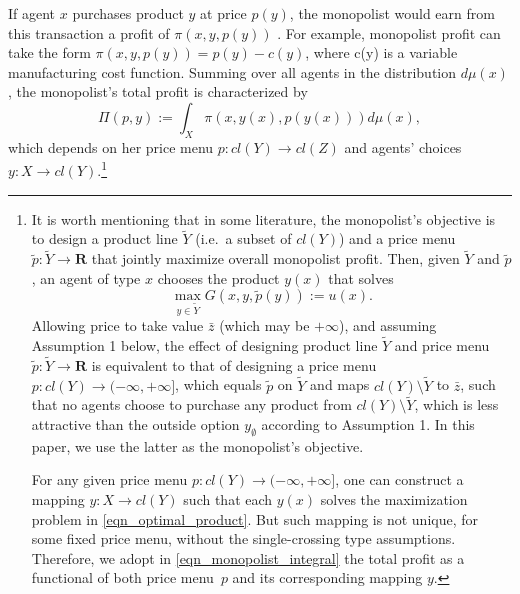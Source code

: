 \documentclass[a4paper, 11pt]{amsart}
\numberwithin{equation}{section}
\theoremstyle{plain}
\theoremstyle{definition}
\theoremstyle{remark}
\newcommand{\R}{\mathbf{R}}
\begin{document}
If agent $x$ purchases product $y$ at price $p(y)$, the monopolist would earn from this transaction a profit of $\pi(x,y,p(y))$%
.  {For example, monopolist profit can take the form $\pi(x,y,p(y)) = p(y)-c(y)$, where %
c(y) is a variable manufacturing cost function.} Summing over all agents in the distribution $d\mu(x)$, the monopolist's total profit is characterized by 
\begin{equation}\label{eqn_monopolist_integral}
	\Pi(p, y):=\int_{X} \pi(x, y(x), p(y(x))) d\mu(x),
\end{equation}
which depends on her price menu $p: cl(Y) \rightarrow cl(Z)$ and  agents' choices $y: X \rightarrow cl(Y)$.\footnote{It is worth mentioning that in some literature, the monopolist's objective is to design a product line $\tilde{Y}$ (i.e.~a subset of $cl(Y)$) and a price menu $\tilde{p}: \tilde{Y} \rightarrow \R$ that jointly maximize overall monopolist profit. Then, given $\tilde{Y}$ and $\tilde{p}$, an agent of type $x$ chooses the product $y(x)$ that solves
	\begin{equation*}
		\max_{y \in \tilde{Y}} G(x,y, \tilde{p}(y)):= u(x).
	\end{equation*}
Allowing price to take value $\bar{z}$ (which may be $+\infty$), and assuming Assumption 1 below, the effect of designing product line $\tilde{Y}$ and price menu $\tilde{p}: \tilde{Y}\rightarrow \R$ is equivalent to that of designing a price menu $p : cl(Y)\rightarrow (-\infty, +\infty]$, which equals $\tilde{p}$ on $\tilde{Y}$ and maps $cl(Y) \setminus \tilde{Y}$ to $\bar{z}$, such that no agents choose to purchase any product from $cl(Y) \setminus \tilde{Y}$, which is less attractive than the outside option $y_{\emptyset}$ according to Assumption 1. In this paper, we use the latter as the monopolist's objective.
 \vspace{0.1cm}
 
For any given price menu $p: cl(Y)\rightarrow (-\infty, +\infty]$, one can construct a mapping $y: X \rightarrow cl(Y)$ such that each $y(x)$ solves the maximization problem in \eqref{eqn_optimal_product}. But such mapping is not unique, for some fixed price menu, without the single-crossing type assumptions. %
Therefore, we adopt in \eqref{eqn_monopolist_integral} the total profit as a functional of both price menu~$p$ and its corresponding mapping $y$.}\medskip
\end{document}
